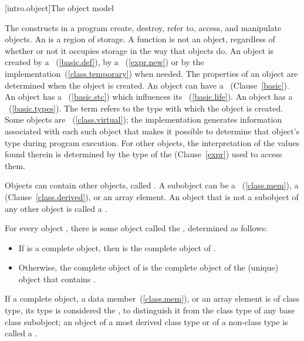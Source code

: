 [intro.object]{The \Cpp object model}

\pnum
{}%
%
The constructs in a \Cpp program create, destroy, refer to, access, and
manipulate objects. An  is a region of storage.
\enternote A function is not an object, regardless of whether or not it
occupies storage in the way that objects do. \exitnote An object is
created by a ~(\ref{basic.def}), by a
~(\ref{expr.new}) or by the
implementation~(\ref{class.temporary}) when needed. The properties of an
object are determined when the object is created. An object can have a
~(Clause~\ref{basic}). An object has a ~(\ref{basic.stc}) which influences its
~(\ref{basic.life}). An object has a
~(\ref{basic.types}). The term  refers to
the type with which the object is created.
Some objects are
~(\ref{class.virtual}); the implementation
generates information associated with each such object that makes it
possible to determine that object's type during program execution. For
other objects, the interpretation of the values found therein is
determined by the type of the  (Clause~\ref{expr})
used to access them.

\pnum
{}%
Objects can contain other objects, called .
A subobject can be
a ~(\ref{class.mem}), a 
(Clause~\ref{class.derived}), or an array element.
%
An object that is not a subobject of any other object is called a .

\pnum
For every object , there is some object called the
 , determined as follows:

\begin{itemize}

\item
If  is a complete object, then  is the complete
object of .

\item
Otherwise, the complete object of  is the complete object
of the (unique) object that contains .

\end{itemize}

\pnum
If a complete object, a data member~(\ref{class.mem}), or an array element is of
class type, its type is considered the , to distinguish it from the class type of any base class subobject;
an object of a most derived class type or of a non-class type is called a
.

